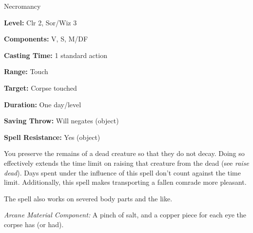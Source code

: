 
Necromancy

\textbf{Level:} Clr 2, Sor/Wiz 3

\textbf{Components:} V, S, M/DF

\textbf{Casting Time:} 1 standard action

\textbf{Range:} Touch

\textbf{Target:} Corpse touched

\textbf{Duration:} One day/level

\textbf{Saving Throw:} Will negates (object)

\textbf{Spell Resistance:} Yes (object)

You preserve the remains of a dead creature so that they do not decay. Doing so 
effectively extends the time limit on raising that creature from the dead (see 
\textit{raise dead}). Days spent under the influence of this spell don't count 
against the time limit. Additionally, this spell makes transporting a fallen comrade 
more pleasant.

The spell also works on severed body parts and the like.

\textit{Arcane Material Component:} A pinch of salt, and a copper piece for each 
eye the corpse has (or had).

